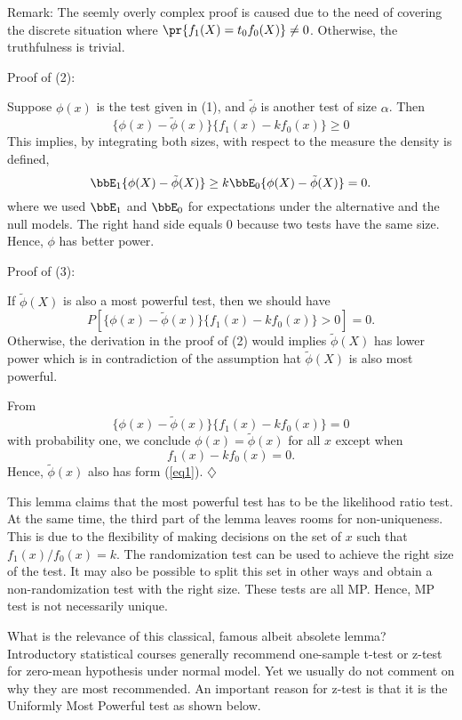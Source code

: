 \vs \vs \no
Remark: The seemly overly complex proof is
caused due to the need of covering the discrete situation where
$\pr \{ f_1(X) = t_0 f_0(X)\} \neq 0$. 
Otherwise, the truthfulness is trivial.

\vs \no
Proof of (2):

Suppose $\phi(x)$ is the test given in (1), and $\tilde \phi$ is another test of
size $\alpha$. Then
\[
\{ \phi(x) - \tilde \phi(x) \} \{ f_1(x) - k f_0(x) \} \geq 0
\]
This implies, by integrating both sizes, with respect to the measure the density
is defined,
\[
\bbE_1 \{ \phi(X) - \tilde \phi(X)\}
\geq
k \bbE_0 \{ \phi(X) - \tilde \phi(X)\} = 0.
\]
where we used $\bbE_1$ and $\bbE_0$ for expectations under the alternative and
 the null models. The right hand side equals 0 because two tests
have the same size. Hence, $\phi$ has better power.

\vs\no
Proof of (3):

If $\tilde \phi(X)$ is also a most powerful test, then we should have 
\[
P [ \{ \phi(x) - \tilde \phi(x) \} \{ f_1(x) - k f_0(x) \} > 0 ] =0.
\]
Otherwise, the derivation in the proof of (2) would implies
$\tilde \phi(X)$ has lower power which is in contradiction 
of the assumption hat $\tilde \phi(X)$ is also most powerful.

From
\[
\{ \phi(x) - \tilde \phi(x) \} \{ f_1(x) - k f_0(x) \} =0
\]
with probability one, we conclude $\phi(x) = \tilde \phi(x)$
for all $x$ except when
\[
 f_1(x) - k f_0(x)=0.
\]
Hence, $\tilde \phi(x)$ also has form (\ref{eq1}).
\hfill{$\diamondsuit$}

\vs
This lemma claims that the most powerful test has to be the likelihood
ratio test. At the same time, the third part of the lemma leaves rooms for non-uniqueness. 
This is due to the flexibility of making decisions
on the set of $x$ such that $f_1(x)/f_0(x) = k$.
The randomization test can be used to achieve the right size of the test.
It may also be possible to split this set in other ways and obtain
a non-randomization test with the right size. These tests are all MP.
Hence, MP test is not necessarily unique.

What is the relevance of this classical, famous
albeit absolete lemma? Introductory statistical courses
generally recommend one-sample t-test or z-test for
zero-mean hypothesis under normal model. Yet we usually
do not comment on why they are most recommended.
An important reason for z-test is that it is the Uniformly Most Powerful
test as shown below.

